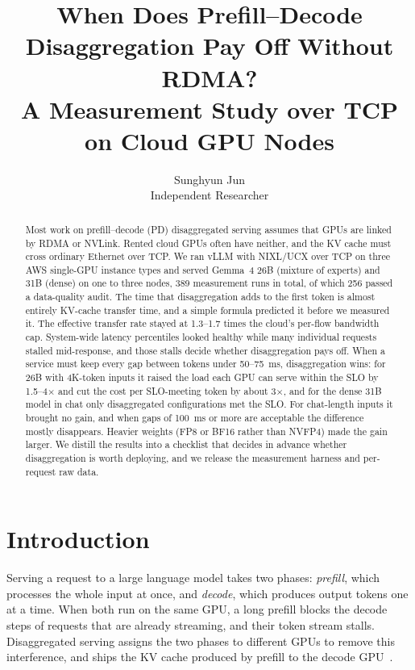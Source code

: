 \documentclass[11pt]{article}
\title{When Does Prefill--Decode Disaggregation Pay Off Without RDMA?\\
\large A Measurement Study over TCP on Cloud GPU Nodes}
\author{Sunghyun Jun\\ Independent Researcher\\ \todo{contact email}}
\date{\todo{draft, 2026-09-30}}
\begin{document}
\maketitle

\begin{abstract}
Most work on prefill--decode (PD) disaggregated serving assumes that GPUs are linked by RDMA or NVLink. Rented cloud GPUs often have neither, and the KV cache must cross ordinary Ethernet over TCP. We ran vLLM with NIXL/UCX over TCP on three AWS single-GPU instance types and served Gemma~4 26B (mixture of experts) and 31B (dense) on one to three nodes, 389 measurement runs in total, of which 256 passed a data-quality audit. The time that disaggregation adds to the first token is almost entirely KV-cache transfer time, and a simple formula predicted it before we measured it. The effective transfer rate stayed at 1.3--1.7 times the cloud's per-flow bandwidth cap. System-wide latency percentiles looked healthy while many individual requests stalled mid-response, and those stalls decide whether disaggregation pays off. When a service must keep every gap between tokens under 50--75~ms, disaggregation wins: for 26B with 4K-token inputs it raised the load each GPU can serve within the SLO by 1.5--4$\times$ and cut the cost per SLO-meeting token by about 3$\times$, and for the dense 31B model in chat only disaggregated configurations met the SLO. For chat-length inputs it brought no gain, and when gaps of 100~ms or more are acceptable the difference mostly disappears. Heavier weights (FP8 or BF16 rather than NVFP4) made the gain larger. We distill the results into a checklist that decides in advance whether disaggregation is worth deploying, and we release the measurement harness and per-request raw data.
\end{abstract}

\section{Introduction}

Serving a request to a large language model takes two phases: \emph{prefill}, which processes the whole input at once, and \emph{decode}, which produces output tokens one at a time. When both run on the same GPU, a long prefill blocks the decode steps of requests that are already streaming, and their token stream stalls. Disaggregated serving assigns the two phases to different GPUs to remove this interference, and ships the KV cache produced by prefill to the decode GPU~\cite{distserve,splitwise,mooncake}.
\end{document}
